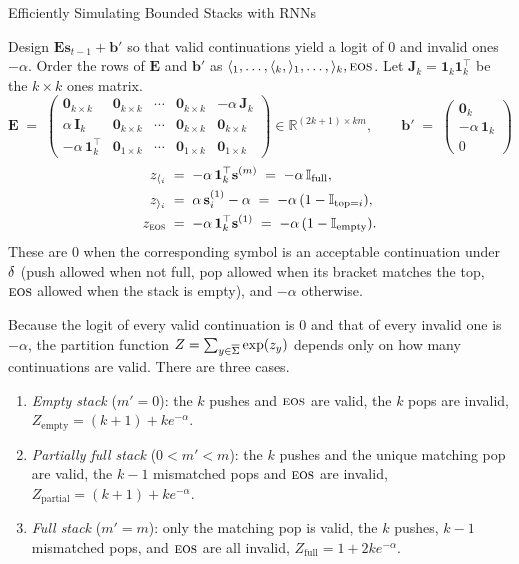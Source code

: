 \begin{question}{Efficiently Simulating Bounded Stacks with RNNs}
\begin{subquestion}
    Design $\mathbf{E}\mathbf{s}_{t-1} + \mathbf{b}'$ so that valid continuations yield a logit of $0$ and invalid ones $-\alpha$. 
    Order the rows of $\mathbf{E}$ and $\mathbf{b}'$ as $\openBr{1}, \dots, \openBr{k}, \closeBr{1}, \dots, \closeBr{k}, \eos$.
    Let $\mathbf{J}_k = \mathbf{1}_k\mathbf{1}_k^\top$ be the $k \times k$ ones matrix.
    \[
        \mathbf{E} \;=\;
        \begin{pmatrix}
            \mathbf{0}_{k\times k} & \mathbf{0}_{k\times k} & \cdots & \mathbf{0}_{k\times k} & -\alpha\,\mathbf{J}_k \\[2pt]
            \alpha\,\mathbf{I}_k   & \mathbf{0}_{k\times k} & \cdots & \mathbf{0}_{k\times k} & \mathbf{0}_{k\times k} \\[2pt]
            -\alpha\,\mathbf{1}_k^\top & \mathbf{0}_{1\times k} & \cdots & \mathbf{0}_{1\times k} & \mathbf{0}_{1\times k}
        \end{pmatrix} \in \mathbb{R}^{(2k+1) \times km},
        \qquad
        \mathbf{b}' \;=\;
        \begin{pmatrix} \mathbf{0}_{k} \\ -\alpha\,\mathbf{1}_{k} \\ 0 \end{pmatrix}
    \]
    \begin{align*}
        z_{\openBr{i}} \;&=\; -\alpha\,\mathbf{1}_k^\top \mathbf{s}^{(m)} \;=\; -\alpha\,\mathbb{I}_{\text{full}}, \\
        z_{\closeBr{i}} \;&=\; \alpha\,\mathbf{s}^{(1)}_i - \alpha \;=\; -\alpha\,(1 - \mathbb{I}_{\text{top}=i}), \\
        z_{\eos} \;&=\; -\alpha\,\mathbf{1}_k^\top \mathbf{s}^{(1)} \;=\; -\alpha\,(1 - \mathbb{I}_{\text{empty}}).
    \end{align*}
    These are $0$ when the corresponding symbol is an acceptable continuation under $\trans$ (push allowed when not full, pop allowed when its bracket matches the top, $\eos$ allowed when the stack is empty), and $-\alpha$ otherwise.

    Because the logit of every valid continuation is $0$ and that of every invalid one is $-\alpha$, the partition function $Z = \sum_{y \in \overline{\alphabet}} \exp(z_y)$ depends only on how many continuations are valid. 
    There are three cases.
    \begin{enumerate}
        \item \emph{Empty stack} ($m' = 0$): the $k$ pushes and $\eos$ are valid, the $k$ pops are invalid, $Z_{\text{empty}} = (k+1) + k e^{-\alpha}$.
        \item \emph{Partially full stack} ($0 < m' < m$): the $k$ pushes and the unique matching pop are valid, the $k-1$ mismatched pops and $\eos$ are invalid, $Z_{\text{partial}} = (k+1) + k e^{-\alpha}$.
        \item \emph{Full stack} ($m' = m$): only the matching pop is valid, the $k$ pushes, $k-1$ mismatched pops, and $\eos$ are all invalid, $Z_{\text{full}} = 1 + 2k e^{-\alpha}$.
    \end{enumerate}


\end{subquestion}
\end{question}
